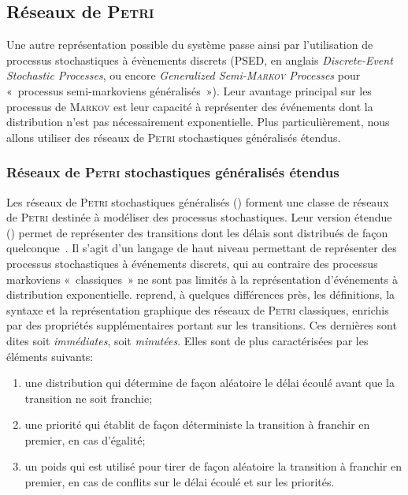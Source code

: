     \subsection{Réseaux de \textsc{Petri}}

Une autre représentation possible du système passe ainsi par l'utilisation de processus stochastiques à évènements discrets (PSED, en anglais \textit{Discrete-Event Stochastic Processes}, ou encore \textit{Generalized Semi-\textsc{Markov} Processes} pour « processus semi-markoviens généralisés »).
Leur avantage principal sur les processus de \textsc{Markov} est leur capacité à représenter des événements dont la distribution n'est pas nécessairement exponentielle.
Plus particulièrement, nous allons utiliser des réseaux de \textsc{Petri} stochastiques généralisés étendus.

        \subsubsection{Réseaux de \textsc{Petri} stochastiques généralisés étendus}
\label{sa:subsubsec:presRPSGe}
Les réseaux de \textsc{Petri} stochastiques généralisés (\rpsg) forment une classe de réseaux de \textsc{Petri} destinée à modéliser des processus stochastiques.
Leur version étendue (\rpsge) permet de représenter des transitions dont les délais sont distribués de façon quelconque~\cite{ABCDF95}.
Il s'agit d'un langage de haut niveau permettant de représenter des processus stochastiques à événements discrets, qui au contraire des processus markoviens «~classiques~» ne sont pas limités à la représentation d'événements à distribution exponentielle.
\rpsge reprend, à quelques différences près, les définitions, la syntaxe et la représentation graphique des réseaux de \textsc{Petri} classiques, enrichis par des propriétés supplémentaires portant sur les transitions.
Ces dernières sont dites soit \textit{immédiates}, soit \textit{minutées}.
Elles sont de plus caractérisées par les éléments suivants:
\begin{enumerate}
    \item une distribution qui détermine de façon aléatoire le délai écoulé avant que la transition ne soit franchie;
    \item une priorité qui établit de façon déterministe la transition à franchir en premier, en cas d'égalité;
    \item un poids qui est utilisé pour tirer de façon aléatoire la transition à franchir en premier, en cas de conflits sur le délai écoulé et sur les priorités.
\end{enumerate}

